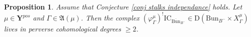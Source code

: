 \documentclass[11pt]{amsart}
\theoremstyle{plain}
\newtheorem{prop}[thm]{Proposition}
\theoremstyle{remark}
\numberwithin{equation}{section}
\begin{document}
	
	\begin{prop}\label{prop stacks of BunB}Assume that Conjecture \ref{conj stalks independance} holds. Let $\mu\in \mathbf{Y}^{pos}$ and $\Gamma\in\mathfrak{A}(\mu)$. Then the complex $(\varphi_{\Gamma}^{\mu})^!\mathrm{IC}_{\overline{\mathrm{Bun}}_{B^-}}\in \mathrm{D}({\mathrm{Bun}}_{B^-}\times X_\Gamma^\mu)$ lives in perverse cohomological degrees $\geq2$.
		
		
	\end{prop}
	
\end{document}
